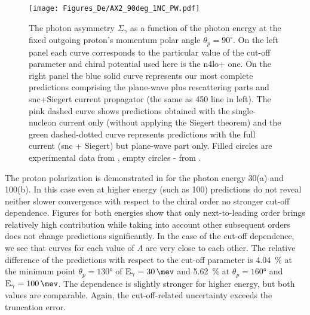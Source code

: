      
    \begin{figure}[h]
        \begin{center}
        \texttt{[image: Figures\_De/AX2\_90deg\_1NC\_PW.pdf]}
        \end{center}
        \caption{The photon asymmetry $\Sigma_\gamma$ 
        as a function of the photon energy  
        at the fixed outgoing proton's momentum polar angle $\theta_p=90^\circ$.
        On the left panel each curve corresponds to the particular value of the cut-off parameter
        and chiral potential used here is the \gls{n4lo+} one.
        On the right panel the blue solid curve represents our most complete predictions
        comprising the plane-wave plus rescattering parts and \gls{snc}+Siegert current propagator 
        (the same as \SI{450}{\mev} line in left).
        The pink dashed curve shows predictions obtained with
        the single-nucleon current only (without applying the Siegert theorem) and the green dashed-dotted
        curve represents predictions with the full current (\gls{snc} + Siegert) but plane-wave part only.
        Filled circles are experimental data from \cite{delbianco_1981},
        empty circles - from \cite{depascale_asymmetry}.}
        \label{asymmetry_90deg}
    \end{figure}


    The proton polarization is demonstrated in  for the 
    photon energy \SI{30}{\mev}(a) and \SI{100}{\mev}(b).
    In this case even at higher energy
    (such as \SI{100}{\mev}) predictions do not reveal neither
    slower convergence with respect to the chiral order no
    stronger cut-off dependence. Figures for both energies show
    that only next-to-leading order brings relatively high contribution
    while taking into account other subsequent orders does not change predictions
    significantly. In the case of the cut-off dependence, we see that curves for each
    value of $\Lambda$ are very close to each other. 
    The relative difference of the predictions with respect to the cut-off parameter
    is \SI{4.04}{\percent} at the minimum point $\theta_p=\ang{130}$ of $\text{E}_\gamma = \SI{30}{\mev}$
    and \SI{5.62}{\percent} at $\theta_p=\ang{160}$ and $\text{E}_\gamma = \SI{100}{\mev}$.
    The dependence is slightly stronger for higher energy, but both values are comparable.
    Again, the cut-off-related uncertainty exceeds the truncation error.

